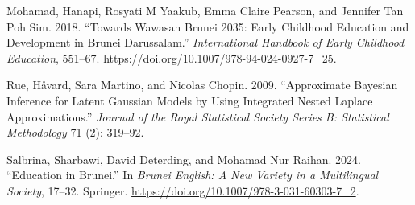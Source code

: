 \documentclass[
  12pt,
]{article}
\newlength{\cslhangindent}
\newenvironment{CSLReferences}[2] %
 {\begin{list}{}{%
  \setlength{\itemindent}{0pt}
  \setlength{\leftmargin}{0pt}
  \setlength{\parsep}{0pt}
  \ifodd #1
   \setlength{\leftmargin}{\cslhangindent}
   \setlength{\itemindent}{-1\cslhangindent}
  \fi
  \setlength{\itemsep}{#2\baselineskip}}}
 {\end{list}}
\begin{document}
\begin{CSLReferences}{1}{0}
Mohamad, Hanapi, Rosyati M Yaakub, Emma Claire Pearson, and Jennifer Tan
Poh Sim. 2018. {``Towards Wawasan Brunei 2035: Early Childhood Education
and Development in Brunei Darussalam.''} \emph{International Handbook of
Early Childhood Education}, 551--67.
\url{https://doi.org/10.1007/978-94-024-0927-7_25}.

Rue, Håvard, Sara Martino, and Nicolas Chopin. 2009. {``Approximate
Bayesian Inference for Latent Gaussian Models by Using Integrated Nested
Laplace Approximations.''} \emph{Journal of the Royal Statistical
Society Series B: Statistical Methodology} 71 (2): 319--92.

Salbrina, Sharbawi, David Deterding, and Mohamad Nur Raihan. 2024.
{``Education in Brunei.''} In \emph{Brunei English: A New Variety in a
Multilingual Society}, 17--32. Springer.
\url{https://doi.org/10.1007/978-3-031-60303-7_2}.

\end{CSLReferences}
\end{document}
